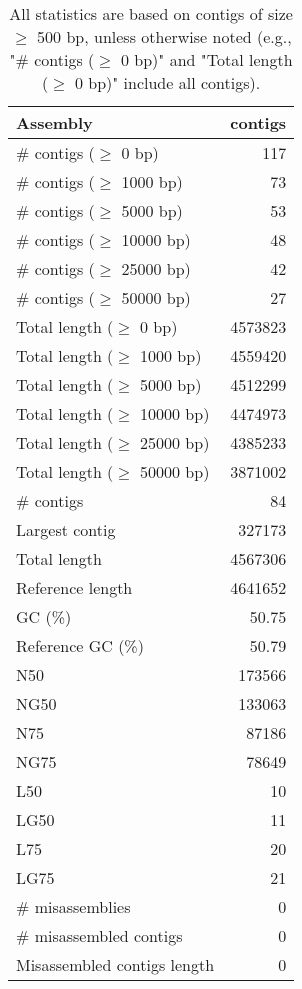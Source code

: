 \documentclass[12pt,a4paper]{article}
\begin{document}
\begin{table}[ht]
\begin{center}
\caption{All statistics are based on contigs of size $\geq$ 500 bp, unless otherwise noted (e.g., "\# contigs ($\geq$ 0 bp)" and "Total length ($\geq$ 0 bp)" include all contigs).}
\begin{tabular}{|l*{1}{|r}|}
\hline
Assembly & contigs \\ \hline
\# contigs ($\geq$ 0 bp) & 117 \\ \hline
\# contigs ($\geq$ 1000 bp) & 73 \\ \hline
\# contigs ($\geq$ 5000 bp) & 53 \\ \hline
\# contigs ($\geq$ 10000 bp) & 48 \\ \hline
\# contigs ($\geq$ 25000 bp) & 42 \\ \hline
\# contigs ($\geq$ 50000 bp) & 27 \\ \hline
Total length ($\geq$ 0 bp) & 4573823 \\ \hline
Total length ($\geq$ 1000 bp) & 4559420 \\ \hline
Total length ($\geq$ 5000 bp) & 4512299 \\ \hline
Total length ($\geq$ 10000 bp) & 4474973 \\ \hline
Total length ($\geq$ 25000 bp) & 4385233 \\ \hline
Total length ($\geq$ 50000 bp) & 3871002 \\ \hline
\# contigs & 84 \\ \hline
Largest contig & 327173 \\ \hline
Total length & 4567306 \\ \hline
Reference length & 4641652 \\ \hline
GC (\%) & 50.75 \\ \hline
Reference GC (\%) & 50.79 \\ \hline
N50 & 173566 \\ \hline
NG50 & 133063 \\ \hline
N75 & 87186 \\ \hline
NG75 & 78649 \\ \hline
L50 & 10 \\ \hline
LG50 & 11 \\ \hline
L75 & 20 \\ \hline
LG75 & 21 \\ \hline
\# misassemblies & 0 \\ \hline
\# misassembled contigs & 0 \\ \hline
Misassembled contigs length & 0 \\ \hline

\end{tabular}
\end{center}
\end{table}
\end{document}
